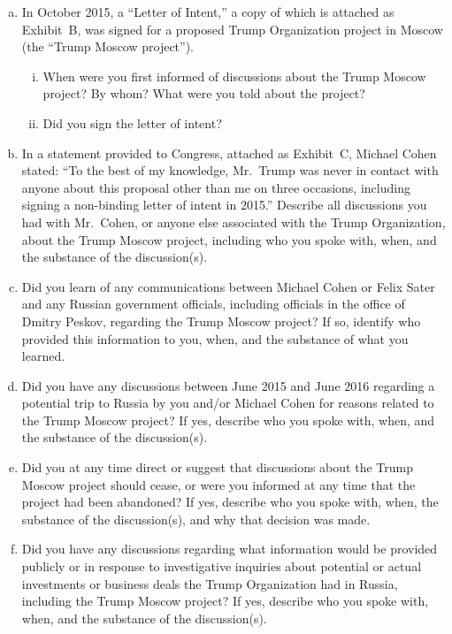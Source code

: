 \begin{enumerate}[a.]

\item In October 2015, a ``Letter of Intent,'' a copy of which is attached as Exhibit~B, was signed for a proposed Trump Organization project in Moscow (the ``Trump Moscow project'').

\begin{enumerate}[i.]

\item When were you first informed of discussions about the Trump Moscow project?
By whom?
What were you told about the project?

\item Did you sign the letter of intent?

\end{enumerate}

\item In a statement provided to Congress, attached as Exhibit~C, Michael Cohen stated: ``To the best of my knowledge, Mr.~Trump was never in contact with anyone about this proposal other than me on three occasions, including signing a non-binding letter of intent in 2015.''
Describe all discussions you had with Mr.~Cohen, or anyone else associated with the Trump Organization, about the Trump Moscow project, including who you spoke with, when, and the substance of the discussion(s).

\item Did you learn of any communications between Michael Cohen or Felix Sater and any Russian government officials, including officials in the office of Dmitry Peskov, regarding the Trump Moscow project?
If so, identify who provided this information to you, when, and the substance of what you learned.

\item Did you have any discussions between June 2015 and June 2016 regarding a potential trip to Russia by you and/or Michael Cohen for reasons related to the Trump Moscow project?
If yes, describe who you spoke with, when, and the substance of the discussion(s).

\item Did you at any time direct or suggest that discussions about the Trump Moscow project should cease, or were you informed at any time that the project had been abandoned?
If yes, describe who you spoke with, when, the substance of the discussion(s), and why that decision was made.

\item Did you have any discussions regarding what information would be provided publicly or in response to investigative inquiries about potential or actual investments or business deals the Trump Organization had in Russia, including the Trump Moscow project?
If yes, describe who you spoke with, when, and the substance of the discussion(s).


\end{enumerate}
